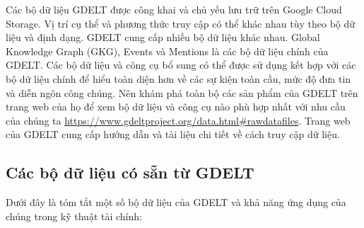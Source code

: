 Các bộ dữ liệu GDELT được công khai và chủ yếu lưu trữ trên Google Cloud Storage. Vị trí cụ thể và phương thức truy cập có thể khác nhau tùy theo bộ dữ liệu và định dạng. GDELT cung cấp nhiều bộ dữ liệu khác nhau. Global Knowledge Graph (GKG), Events và Mentions là các bộ dữ liệu chính của GDELT. Các bộ dữ liệu và công cụ bổ sung có thể được sử dụng kết hợp với các bộ dữ liệu chính để hiểu toàn diện hơn về các sự kiện toàn cầu, mức độ đưa tin và diễn ngôn công chúng. Nên khám phá toàn bộ các sản phẩm của GDELT trên trang web của họ để xem bộ dữ liệu và công cụ nào phù hợp nhất với nhu cầu của chúng ta \url{https://www.gdeltproject.org/data.html\#rawdatafiles}. Trang web của GDELT cung cấp hướng dẫn và tài liệu chi tiết về cách truy cập dữ liệu.

\subsection{Các bộ dữ liệu có sẵn từ GDELT}

Dưới đây là tóm tắt một số bộ dữ liệu của GDELT và khả năng ứng dụng của chúng trong kỹ thuật tài chính:

